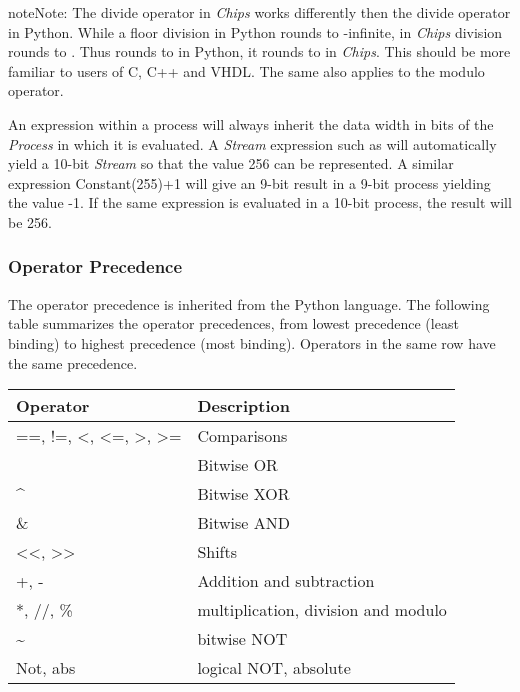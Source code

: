 \documentclass[letterpaper,10pt,english]{sphinxmanual}
\begin{document}
\begin{notice}{note}{Note:}
The divide \code{//} operator in \emph{Chips} works differently then the divide
operator in Python.  While a floor division in Python rounds to -infinite,
in \emph{Chips} division rounds to . Thus  rounds to  in
Python, it rounds to  in \emph{Chips}. This should be more familiar to
users of C, C++ and VHDL. The same also applies to the modulo \code{\%}
operator.
\end{notice}

An expression within a process will always inherit the data width in bits of
the \emph{Process} in which it is evaluated. A \emph{Stream} expression such as
 will automatically yield a 10-bit \emph{Stream} so that the
value 256 can be represented. A similar expression Constant(255)+1 will give an
9-bit result in a 9-bit process yielding the value -1. If the same expression
is evaluated in a 10-bit process, the result will be 256.


\subsubsection{Operator Precedence}
\label{language_reference/index:operator-precedence}
The operator precedence is inherited from the Python language. The following
table summarizes the operator precedences, from lowest precedence (least
binding) to highest precedence (most binding). Operators in the same row have
the same precedence.

\begin{tabulary}{\linewidth}{|L|L|}
\hline
\textbf{
Operator
} & \textbf{
Description
}\\
\hline

==, !=, \textless{}, \textless{}=, \textgreater{}, \textgreater{}=
 & 
Comparisons
\\
{\raggedright{}~}
 & 
Bitwise OR
\\

\textasciicircum{}
 & 
Bitwise XOR
\\

\&
 & 
Bitwise AND
\\

\textless{}\textless{}, \textgreater{}\textgreater{}
 & 
Shifts
\\

+, -
 & 
Addition and subtraction
\\

*, //, \%
 & 
multiplication, division and modulo
\\

\textasciitilde{}
 & 
bitwise NOT
\\

Not, abs
 & 
logical NOT, absolute
\\
\hline
\end{tabulary}
\end{document}

